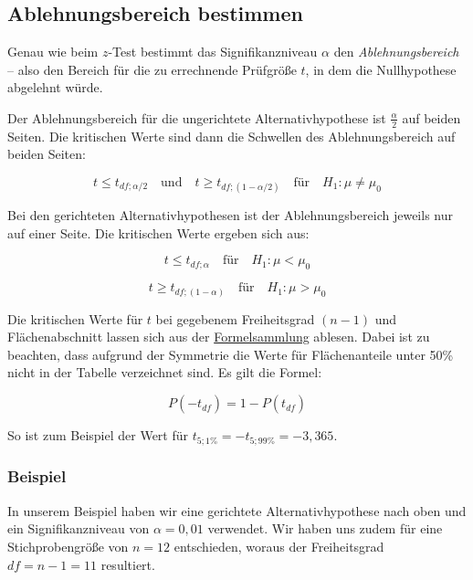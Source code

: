 \documentclass[
  11pt,
  ngerman,
  a4paper,
]{report}
\begin{document}
\hypertarget{ablehnungsbereich-bestimmen-1}{%
\subsection{Ablehnungsbereich bestimmen}\label{ablehnungsbereich-bestimmen-1}}

Genau wie beim \(z\)-Test bestimmt das Signifikanzniveau \(\alpha\) den \emph{Ablehnungsbereich} -- also den Bereich für die zu errechnende Prüfgröße \(t\), in dem die Nullhypothese abgelehnt würde.

Der Ablehnungsbereich für die ungerichtete Alternativhypothese ist \(\frac{\alpha}{2}\) auf beiden Seiten. Die kritischen Werte sind dann die Schwellen des Ablehnungsbereich auf beiden Seiten:

\[
t \leq t_{\mathit{df};\alpha/2} \quad \textrm{und} \quad t \geq t_{\mathit{df};(1-\alpha/2)} \quad \textrm{für} \quad H_1: \mu \neq \mu_0
\label{eq:kritneq}
\]

Bei den gerichteten Alternativhypothesen ist der Ablehnungsbereich jeweils nur auf einer Seite. Die kritischen Werte ergeben sich aus:

\[
t \leq t_{\mathit{df};\alpha} \quad \textrm{für} \quad H_1: \mu < \mu_0
\label{eq:kritless}
\]

\[
t \geq t_{\mathit{df};(1-\alpha)} \quad \textrm{für} \quad H_1: \mu > \mu_0
\label{eq:kritless}
\]

Die kritischen Werte für \(t\) bei gegebenem Freiheitsgrad \((n-1)\) und Flächenabschnitt lassen sich aus der \protect\hyperlink{formeln}{Formelsammlung} ablesen. Dabei ist zu beachten, dass aufgrund der Symmetrie die Werte für Flächenanteile unter 50\% nicht in der Tabelle verzeichnet sind. Es gilt die Formel:

\[
P(-t_\mathit{df})=1-P(t_\mathit{df})
\label{eq:negt}
\]

So ist zum Beispiel der Wert für \(t_{5;1\%}=-t_{5;99\%}=-3{,}365\).

\hypertarget{beispiel-9}{%
\subsubsection{Beispiel}\label{beispiel-9}}

In unserem Beispiel haben wir eine gerichtete Alternativhypothese nach oben und ein Signifikanzniveau von \(\alpha=0{,}01\) verwendet. Wir haben uns zudem für eine Stichprobengröße von \(n=12\) entschieden, woraus der Freiheitsgrad \(\mathit{df}=n-1=11\) resultiert.
\end{document}
